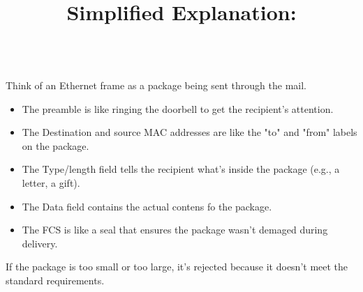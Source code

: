 \documentclass[a4paper,11pt]{article}
\begin{document}
\title{Simplified Explanation:}\\
Think of an Ethernet frame as a package being sent through the mail.\\
\begin{itemize}
    \item The preamble is like ringing the doorbell to get the recipient's attention.\\
    \item The Destination and source MAC addresses are like the "to" and "from" labels on the package.\\
    \item The Type/length field tells the recipient what's inside the package (e.g., a letter, a gift).\\
    \item The Data field contains the actual contens fo the package.\\
    \item The FCS is like a seal that ensures the package wasn't  demaged during delivery.
\end{itemize}

If the package is too small or too large, it's rejected because it doesn't meet the standard requirements.\\
\end{document}
